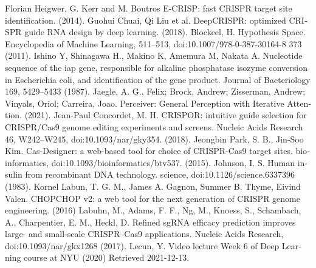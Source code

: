 \documentclass[12pt,a4paper,BCOR=.7cm,headsepline,bibliography=totoc]{report}
\begin{document}
\begin{thebibliography}{1}
\begin{latin}
 {Florian Heigwer, G. Kerr and M. Boutros E-CRISP: fast CRISPR target site identification. (2014).}	
 {Guohui Chuai, Qi Liu et al. DeepCRISPR: optimized CRISPR guide RNA design by deep learning.  (2018).}
 {Blockeel, H. Hypothesis Space. Encyclopedia of Machine Learning, 511–513, doi:10.1007/978-0-387-30164-8 373 (2011).}
 {Ishino Y, Shinagawa H., Makino K, Amemura M, Nakata A. Nucleotide sequence of the iap gene, responsible for alkaline phosphatase isozyme conversion in Escherichia coli, and identification of the gene product. Journal of Bacteriology 169, 5429–5433 (1987).}
 {Jaegle, A. G., Felix; Brock, Andrew; Zisserman, Andrew; Vinyals, Oriol; Carreira, Joao. Perceiver: General Perception with Iterative Attention.  (2021).}
 {Jean-Paul Concordet, M. H. CRISPOR: intuitive guide selection for CRISPR/Cas9 genome editing experiments and screens. Nucleic Acids Research 46, W242–W245, doi:10.1093/nar/gky354.  (2018).}
 {Jeongbin Park, S. B., Jin-Soo Kim. Cas-Designer: a web-based tool for choice of CRISPR-Cas9 target sites. bioinformatics, doi:10.1093/bioinformatics/btv537.  (2015).}
 {Johnson, I. S. Human insulin from recombinant DNA technology. science, doi:10.1126/science.6337396 (1983).}
 {Kornel Labun, T. G. M., James A. Gagnon, Summer B. Thyme, Eivind Valen. CHOPCHOP v2: a web tool for the next generation of CRISPR genome engineering. (2016)}
 {Labuhn, M., Adams, F. F., Ng, M., Knoess, S., Schambach, A., Charpentier, E. M., Heckl, D. Refined sgRNA efficacy prediction improves large- and small-scale CRISPR–Cas9 applications. Nucleic Acids Research, doi:10.1093/nar/gkx1268 (2017).}
 {Lecun, Y. Video lecture Week 6 of Deep Learning course at NYU (2020) Retrieved 2021-12-13.}

\end{latin}
\end{thebibliography}
\end{document}
